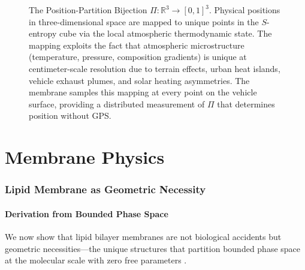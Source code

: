 \documentclass[twocolumn,10pt]{article}
\theoremstyle{definition}
\theoremstyle{remark}
\begin{document}
\begin{figure}[H]
\centering
{}
\caption{The Position-Partition Bijection $\Pi: \mathbb{R}^3 \to [0,1]^3$. Physical positions in three-dimensional space are mapped to unique points in the $S$-entropy cube via the local atmospheric thermodynamic state. The mapping exploits the fact that atmospheric microstructure (temperature, pressure, composition gradients) is unique at centimeter-scale resolution due to terrain effects, urban heat islands, vehicle exhaust plumes, and solar heating asymmetries. The membrane samples this mapping at every point on the vehicle surface, providing a distributed measurement of $\Pi$ that determines position without GPS.}
\label{fig:position_partition}
\end{figure}


\part{Membrane Physics}
\label{part:membrane_physics}

\section{Lipid Membrane as Geometric Necessity}
\label{sec:lipid_membrane}

\subsection{Derivation from Bounded Phase Space}

We now show that lipid bilayer membranes are not biological accidents but geometric necessities---the unique structures that partition bounded phase space at the molecular scale with zero free parameters \cite{sachikonye2026lipid}.
\end{document}
